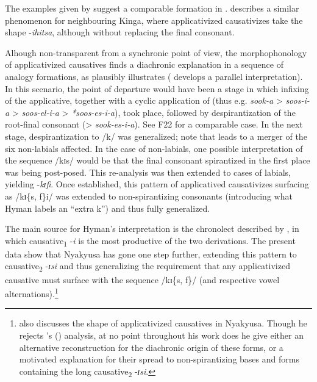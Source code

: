 The examples given by \citet[76]{BotneR2008} suggest a comparable formation in . \citet[63]{WolffR1905} describes a similar phenomenon for neighbouring Kinga, where applicativized causativizes take the shape -\textit{ihitsa}, although without replacing the final consonant.

Alhough non-transparent from a synchronic point of view, the morphophonology of applicativized causatives finds a diachronic explanation in a sequence of analogy formations, as \citet{HymanL2003b} plausibly illustrates (\citealt[266f]{BergerP1938} develops a parallel interpretation). In this scenario, the point of departure would have been a stage in which infixing of the applicative, together with a cyclic application of  (thus e.g. \textit{sook-a} > \textit{soos-i-a} > \textit{soos-el-i-a} > \textit{*soos-es-i-a}), took place, followed by despirantization of the root-final consonant (> \textit{sook-es-i-a}). See  F22 \citep[20ff]{SchadebergTMagangaC1992} for a comparable case. In the next stage, despirantization to /k/ was generalized; note that  leads to a merger of the six non-labials affected. In the case of non-labials, one possible interpretation of the sequence /kɪs/ would be that the final consonant spirantized in the first place was being post-posed. This re-analysis was then extended to cases of labials, yielding -\textit{kɪfi}. Once established, this pattern of applicatived causativizes surfacing as /kɪ\{s, f\}i/ was extended to non-spirantizing consonants (introducing what Hyman labels an ``extra k'') and thus fully generalized.

The main source for Hyman's interpretation is the chronolect described by \citet{SchumannK1899}, in which causative\textsubscript{1} -\textit{i} is the most productive of the two derivations. The present data show that Nyakyusa has gone one step further, extending this pattern to causative\textsubscript{2} -\textit{ɪsi} and thus generalizing the requirement that any applicativized causative must surface with the sequence /kɪ\{s, f\}/ (and respective vowel alternations).\footnote{\citet{LusekeloA2012} also discusses the shape of applicativized causatives in Nyakyusa. Though he rejects \citeauthor{HymanL2003b}'s (\citeyear{HymanL2003b}) analysis, at no point throughout his work does he give either an alternative reconstruction for the diachronic origin of these forms, or a motivated explanation for their spread to non-spirantizing bases and forms containing the long causative\textsubscript{2} -\textit{ɪsi}.}

